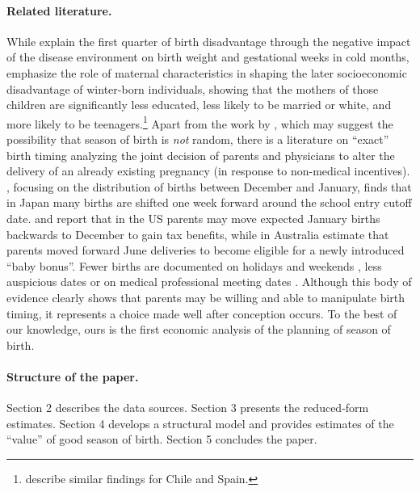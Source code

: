 \documentclass[a4paper, 12 pt]{article}
\theoremstyle{plain}
\begin{document}
\begin{doublespace}
\paragraph{Related literature.} While \citet{CS2013} explain the first quarter of birth disadvantage through the negative impact of the disease environment on birth weight and gestational weeks in cold months, \citet{BucklesHungerman2013} emphasize the role of maternal characteristics in shaping the later socioeconomic disadvantage of winter-born individuals, showing that the mothers of those children are significantly less educated, less likely to be married or white, and more likely to be teenagers.\footnote{\citet{AlbaCaceres2014} describe similar findings for Chile and Spain.} Apart from the work by \citet{BucklesHungerman2013}, which may suggest the possibility that season of birth is \emph{not} random, there is a literature on ``exact'' birth timing analyzing the joint decision of parents and physicians to alter the delivery of an already existing pregnancy (in response to non-medical incentives). \citet{Shigeoka2015}, focusing on the distribution of births between December and January,  finds that in Japan many births are shifted one week forward around the school entry cutoff date. \citet{DCChandra1999} and \citet{LaLumiaetal2015} report that in the US parents may move expected January births backwards to December to gain tax benefits, while in Australia \citet{GansLeigh2009} estimate that parents moved forward June deliveries to become eligible for a newly introduced ``baby bonus''. Fewer births are documented on holidays \citep{Rindfuss1979} and weekends \citep{Gould2003}, less auspicious dates \citep{Almond15} or on medical professional meeting dates \citep{GLV2007}. Although this body of evidence clearly shows that parents may be willing and able to manipulate birth timing, it represents a choice made well after conception occurs. To the best of our knowledge, ours is the first economic analysis of the planning of season of birth.

\paragraph{Structure of the paper.} Section 2 describes the data sources. Section 3 presents the reduced-form estimates. Section 4 develops a structural model and provides estimates of the ``value'' of good season of birth. Section 5 concludes the paper.



\newpage

\end{doublespace}
\end{document}
